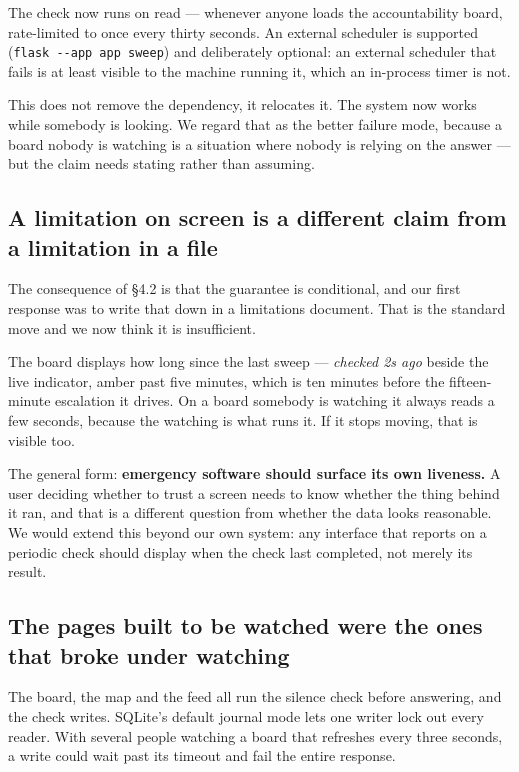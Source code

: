 The check now runs on read --- whenever anyone loads the accountability
board, rate-limited to once every thirty seconds. An external scheduler
is supported (\texttt{flask\ -\/-app\ app\ sweep}) and deliberately
optional: an external scheduler that fails is at least visible to the
machine running it, which an in-process timer is not.

This does not remove the dependency, it relocates it. The system now
works while somebody is looking. We regard that as the better failure
mode, because a board nobody is watching is a situation where nobody is
relying on the answer --- but the claim needs stating rather than
assuming.

\subsection{A limitation on screen is a different claim from a limitation in a file}

The consequence of §4.2 is that the guarantee is conditional, and our
first response was to write that down in a limitations document. That is
the standard move and we now think it is insufficient.

The board displays how long since the last sweep --- \emph{checked 2s
ago} beside the live indicator, amber past five minutes, which is ten
minutes before the fifteen-minute escalation it drives. On a board
somebody is watching it always reads a few seconds, because the watching
is what runs it. If it stops moving, that is visible too.

The general form: \textbf{emergency software should surface its own
liveness.} A user deciding whether to trust a screen needs to know
whether the thing behind it ran, and that is a different question from
whether the data looks reasonable. We would extend this beyond our own
system: any interface that reports on a periodic check should display
when the check last completed, not merely its result.

\subsection{The pages built to be watched were the ones that broke under watching}

The board, the map and the feed all run the silence check before
answering, and the check writes. SQLite's default journal mode lets one
writer lock out every reader. With several people watching a board that
refreshes every three seconds, a write could wait past its timeout and
fail the entire response.

